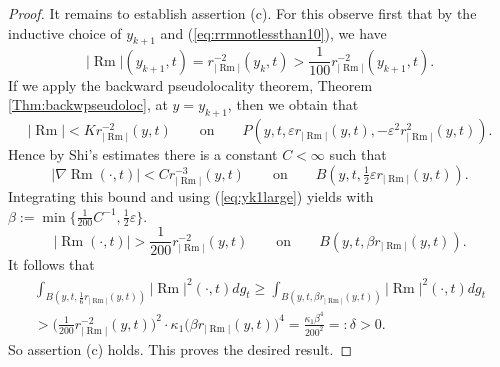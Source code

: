 \documentclass[11pt]{amsart}
\numberwithin{equation}{section}
\DeclareMathOperator{\Rm}{Rm}
\newcommand{\rrm}{r_{|{\Rm}|}}
\numberwithin{equation}{section}
\begin{document}
\begin{proof}
It remains to establish assertion (c).
For this observe first that by the inductive choice of $y_{k+1}$ and (\ref{eq:rrmnotlessthan10}), we have
\begin{equation} \label{eq:yk1large}
 |{\Rm}| (y_{k+1}, t) = \rrm^{-2} (y_k, t) > \frac1{100} \rrm^{-2} (y_{k+1}, t).
\end{equation}
If we apply the backward pseudolocality theorem, Theorem \ref{Thm:backwpseudoloc}, at $y = y_{k+1}$, then we obtain that
\[ |{\Rm}| < K \rrm^{-2} (y,t) \qquad \text{on} \qquad P(y,t, \varepsilon \rrm (y,t), - \varepsilon^2 \rrm^2 (y,t)). \]
Hence by Shi's estimates there is a constant $C < \infty$ such that
\[  |\nabla {\Rm} (\cdot, t)| < C \rrm^{-3} (y, t) \qquad \text{on} \qquad B(y, t, \tfrac12 \varepsilon \rrm (y,t)). \]
Integrating this bound and using (\ref{eq:yk1large}) yields with $\beta := \min \{ \frac1{200} C^{-1}, \tfrac12 \varepsilon \}$.
\[ |{\Rm} (\cdot, t) | > \frac1{200} \rrm^{-2} (y,t) \qquad \text{on} \qquad B(y, t, \beta \rrm (y,t)). \]
It follows that
\begin{multline*}
 \int_{B(y, t, \frac16 \rrm (y,t))} |{\Rm}|^2 (\cdot, t) dg_t \geq \int_{B(y, t, \beta \rrm (y, t))} |{\Rm}|^2 (\cdot, t) dg_t \\ > \Big( \frac1{200} \rrm^{-2} (y,t) \Big)^2 \cdot \kappa_1 \big( \beta \rrm (y,t) \big)^4 = \frac{\kappa_1 \beta^4}{200^2} =: \delta > 0. 
\end{multline*}
So assertion (c) holds.
This proves the desired result.
\end{proof}
\end{document}
